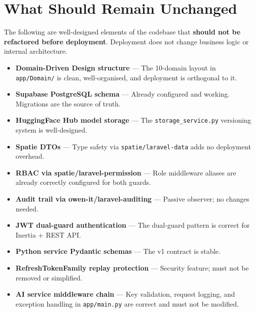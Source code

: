 \documentclass[12pt,a4paper]{report}
\begin{document}
\chapter{What Should Remain Unchanged}
\label{ch:unchanged}

The following are well-designed elements of the codebase that
\textbf{should not be refactored before deployment}. Deployment does
not change business logic or internal architecture.

\begin{itemize}[leftmargin=1.5em]

    \item \textbf{Domain-Driven Design structure} --- The 10-domain
    layout in \texttt{app/Domain/} is clean, well-organised, and
    deployment is orthogonal to it.

    \item \textbf{Supabase PostgreSQL schema} --- Already configured
    and working. Migrations are the source of truth.

    \item \textbf{HuggingFace Hub model storage} --- The
    \texttt{storage\_service.py} versioning system is well-designed.

    \item \textbf{Spatie DTOs} --- Type safety via
    \texttt{spatie/laravel-data} adds no deployment overhead.

    \item \textbf{RBAC via spatie/laravel-permission} --- Role
    middleware aliases are already correctly configured for both guards.

    \item \textbf{Audit trail via owen-it/laravel-auditing} --- Passive
    observer; no changes needed.

    \item \textbf{JWT dual-guard authentication} --- The dual-guard
    pattern is correct for Inertia + REST API.

    \item \textbf{Python service Pydantic schemas} --- The v1 contract
    is stable.

    \item \textbf{RefreshTokenFamily replay protection} --- Security
    feature; must not be removed or simplified.

    \item \textbf{AI service middleware chain} --- Key validation,
    request logging, and exception handling in \texttt{app/main.py}
    are correct and must not be modified.

\end{itemize}
\end{document}
